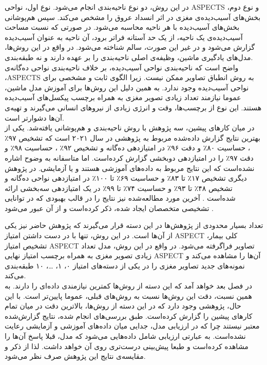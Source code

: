 در این روش، دو نوع ناحیه‌بندی انجام می‌شود.
نوع اول، نواحی ASPECTS و نوع دوم،
بخش‌های آسیب‌دیده‌ی مغزی در اثر انسداد عروق 
را مشخص می‌کند.
سپس هم‌پوشانی بخش‌های آسیب‌دیده با هر ناحیه محاسبه می‌شود.
در صورتی که نسبت مساحت آسیب‌دیده‌ی یک ناحیه، از یک حد آستانه فراتر برود، آن ناحیه به عنوان آسیب‌دیده گزارش می‌شود و در غیر این صورت، سالم شناخته می‌شود.
در واقع در این روش‌ها، مدل‌های یادگیری ماشین، وظیفه‌ی اصلی ناحیه‌بندی را بر عهده دارند و نه طبقه‌بندی.\\

واضح است که ناحیه‌بندی نواحی آسیب‌دیده، بر خلاف ناحیه‌بندی نواحی ده‌گانه‌ی ،ASPECTS
به روش انطباق تصاویر ممکن نیست.
زیرا الگوی ثابت و مشخصی برای نواحی آسیب‌دیده وجود ندارد.
به همین دلیل این روش‌ها برای آموزش مدل ماشین، عموما نیازمند تعداد زیادی تصویر مغزی به همراه برچسب پیکسل‌های آسیب‌دیده هستند.
این نوع از برچسب‌ها، وقت و انرژی زیادی از نیرو‌های انسانی می‌گیرند و تهیه‌ی آن‌ها دشوارتر است.\\

در میان کارهای پیشین،
سه پژوهش با
روش ناحیه‌بندی و هم‌پوشانی
یافته‌شد.
یکی از بهترین نتایج 
گزارش داده‌شده مربوط به پژوهشی در سال ۲۰۲۱ است
\cite{naganuma2021alberta}
که
تشخیص
۹۷٪
،
حساسیت
۸۰٪
و دقت 
۹۶٪
در امتیازدهی ده‌گانه و 
تشخیص
۹۲٪
،
حساسیت
۹۸٪
و دقت 
۹۷٪
را
در امتیازدهی دوبخشی 
گزارش کرده‌است.
اما متاسفانه به وضوح اشاره نشده‌است که این نتایج مربوط به داده‌های آموزشی هستند و یا آزمایشی.
در پژوهش دیگری
تشخیص
۱۷٪
تا
۸۳٪
و
حساسیت
۶۹٪
تا
۱۰۰٪
در امتیازدهی نواحی ده‌گانه و 
تشخیص
۴۸٪
تا
۹۳٪
و
حساسیت
۷۴٪
تا
۹۹٪
در یک امتیازدهی سه‌بخشی 
ارائه شده‌است \cite{naganuma2021alberta}.
آخرین مورد مطالعه‌شده نیز نتایج را در قالب 
بهبودی که در توانایی تشخیصی متخصصان ایجاد شده، ذکر کرده‌است و از آن عبور می‌شود \cite{chen2022improving}.

تعداد بسیار محدودی از پژوهش‌ها در این دسته قرار می‌گیرند
که پژوهش حاضر نیز یکی از آن‌ها است.
در این روش، تنها با در دست داشتن امتیاز ASPECT کلی بیمار، تشخیص امتیاز ASPECT تصاویر فراگرفته می‌شود.
در واقع در این روش، مدل تعداد زیادی تصویر مغزی به همراه برچسب امتیاز نهایی ASPECT آن‌ها را مشاهده می‌کند و 
نمونه‌های جدید تصاویر مغزی را در یکی از دسته‌های امتیاز
۰، ۱، \dots، ۱۰
طبقه‌بندی می‌کند.\\

در فصل بعد خواهد آمد که این دسته از روش‌ها کمترین نیاز‌مندی داده‌ای را دارند.
به همین نسبت، دقت این روش‌ها نسبت به روش‌های قبلی، عموما پایین‌تر است.
با این حال، پژوهشی
\cite{golkonda2022automated}
وجود دارد که در این دسته از روش‌ها، بالاترین دقت 
در میان تمام کارهای پیشین
را گزارش کرده‌است.
طبق بررسی‌های انجام شده، نتایج گزارش‌شده معتبر نیستند
چرا که در ارزیابی مدل، جدایی میان داده‌های آموزشی و آزمایشی رعایت نشده‌است.
به عبارتی ارزیابی شامل داده‌هایی می‌شود که مدل، قبلا پاسخ آن‌ها را مشاهده کرده‌است و طبعا پیش‌بینی درست‌تری روی آن خواهد داشت.
لذا از ذکر و مقایسه‌ی نتایج این پژوهش صرف نظر می‌شود.\\

